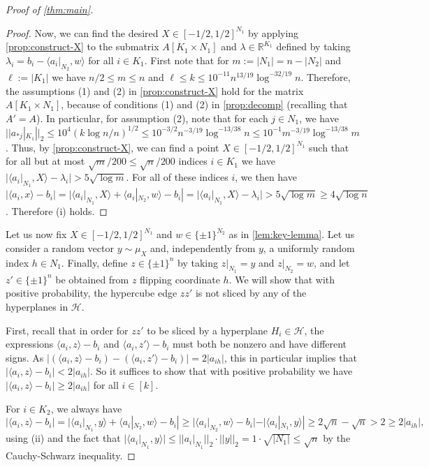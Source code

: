 \documentclass[reqno]{amsart}
\theoremstyle{remark}
\theoremstyle{definition}
\numberwithin{theorem}{section}
\renewcommand{\(}{\bigl(}
\renewcommand{\)}{\bigr)\vphantom{)}}
\newcommand{\cH}{\mathcal H}
\renewcommand{\le}{\leqslant}
\renewcommand{\ge}{\geqslant}
\newcommand{\R}{\mathbb R}
\newcommand{\ang}[1]{\langle#1\rangle}
\newcommand{\bin}{\{\pm 1\}}
\begin{document}
\begin{proof}[Proof of \cref{thm:main}]
\begin{proof}
Now, we can find the desired $X\in [-1/2, 1/2]^{N_1}$ by applying \cref{prop:construct-X} to the submatrix $A[K_1\times N_1]$ and $\lambda\in \R^{K_1}$ defined by taking $\lambda_i = b_i - \ang{a_i|_{N_2}, w}$ for all $i\in K_1$. First note that for $m:=|N_1|=n-|N_2|$ and $\ell:=|K_1|$ we have $n/2\le m\le n$ and $\ell\le k\le 10^{-11}n^{13/19}\log^{-32/19}n$. Therefore, the assumptions (1) and (2) in \cref{prop:construct-X} hold for the matrix $A[K_1\times N_1]$, because of conditions (1) and (2) in \cref{prop:decomp} (recalling that $A'=A$). In particular, for assumption (2), note that for each $j\in N_1$, we have $||a_{*j}|_{K_1}||_2\le 10^4(k\log n/n)^{1/2}\le 10^{-3/2} n^{-3/19}\log^{-13/38}n\le 10^{-1}m^{-3/19}\log^{-13/38}m$. Thus, by \cref{prop:construct-X}, we can find a point $X\in [-1/2, 1/2]^{N_1}$ such that for all but at most $\sqrt{m}/200\le \sqrt{n}/200$ indices $i\in K_1$ we have $|\ang{a_i|_{N_1},X}-\lambda_i| > 5\sqrt{\log m}$. For all of these indices $i$, we then have $|\ang{a_i,x} - b_i| = |\ang{a_i|_{N_1},X} + \ang{a_i|_{N_2},w} - b_i|=|\ang{a_i|_{N_1},X}-\lambda_i|> 5\sqrt{\log m}\ge 4\sqrt{\log n}$. Therefore (i) holds.
\end{proof}



Let us now fix $X\in [-1/2, 1/2]^{N_1}$ and $w\in \bin^{N_2}$ as in \cref{lem:key-lemma}. Let us consider a random vector $y\sim \mu_X$ and, independently from $y$, a uniformly random index $h\in N_1$. Finally, define $z\in \bin^n$ by taking $z|_{N_1}=y$ and $z|_{N_2} = w$, and let $z'\in \bin^n$ be obtained from $z$ flipping coordinate $h$. We will show that with positive probability, the hypercube edge $zz'$ is not sliced by any of the hyperplanes in $\cH$.

First, recall that in order for $zz'$ to be sliced by a hyperplane $H_i\in \cH$, the expressions $\ang{a_i,z} - b_i$ and $\ang{a_i,z'} - b_i$ must both be nonzero and have different signs. As $|(\ang{a_i,z} - b_i)-(\ang{a_i,z'} - b_i)|=2|a_{ih}|$, this in particular implies that $|\ang{a_i,z} - b_i|<2|a_{ih}|$. So it suffices to show that with positive probability we have $|\ang{a_i,z} - b_i|\ge 2|a_{ih}|$ for all $i\in [k]$.

For $i\in K_2$, we always have
\[|\ang{a_i,z} - b_i|=|\ang{a_i|_{N_1},y} +\ang{a_i|_{N_2},w} - b_i|\ge |\ang{a_i|_{N_2},w} - b_i|-|\ang{a_i|_{N_1},y}|\ge 2\sqrt{n}-\sqrt{n}>2\ge 2|a_{ih}|,\]
using (ii) and the fact that $|\ang{a_i|_{N_1},y}|\le ||a_i|_{N_1}||_2\cdot ||y||_2=1\cdot \sqrt{|N_1|}\le \sqrt{n}$ by the Cauchy-Schwarz inequality.


\end{proof}
\end{document}
